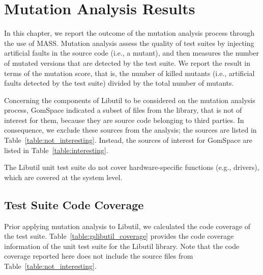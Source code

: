 
\chapter{Mutation Analysis Results}
\label{mass_output}



In this chapter, we report the outcome of the mutation analysis process through the use of MASS. 
Mutation analysis assess the quality of test suites by injecting artificial faults in the source code (i.e., a mutant), and then measures the number of mutated versions that are detected by the test suite. We report the result in terms of the mutation score, that is, the number of killed mutants (i.e., artificial faults detected by the test suite) divided by the total number of mutants.




Concerning the components of Libutil to be considered on the mutation analysis process, GomSpace indicated a subset of files from the library, that is not of interest for them, because they are source code belonging to third parties. In consequence, we exclude these sources from the analysis; the sources are listed in Table~\ref{table:not_interesting}. 
Instead, the sources of interest for GomSpace are listed in Table~\ref{table:interesting}.





The Libutil unit test suite do not cover hardware-specific functions (e.g., drivers), which are covered at the system level.

\section{Test Suite Code Coverage}

Prior applying mutation analysis to Libutil, we calculated the code coverage of the test suite. Table~\ref{table:gslibutil_coverage} provides the code coverage information of the unit test suite for the Libutil library. Note that the code coverage reported here does not include the source files from Table~\ref{table:not_interesting}. 

